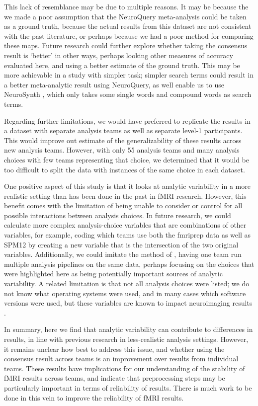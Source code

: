 \documentclass[a4paper,doc,natbib]{apa6}
\begin{document}
This lack of resemblance may be due to multiple reasons. It may be because the we made a poor assumption that the NeuroQuery meta-analysis could be taken as a ground truth, because the actual results from this dataset are not consistent with the past literature, or perhaps because we had a poor method for comparing these maps. Future research could further explore whether taking the consensus result is `better' in other ways, perhaps looking other measures of accuracy evaluated here, and using a better estimate of the ground truth. This may be more achievable in a study with simpler task; simpler search terms could result in a better meta-analytic result using NeuroQuery, as well enable us to use NeuroSynth \citealp{yarkoni2011large}, which only takes some single words and compound words as search terms.

Regarding further limitations, we would have preferred to replicate the results in a dataset with separate analysis teams as well as separate level-1 participants. This would improve out estimate of the generalizability of these results across new analysis teams. However, with only 55 analysis teams and many analysis choices with few teams representing that choice, we determined that it would be too difficult to split the data with instances of the same choice in each dataset.

One positive aspect of this study is that it looks at analytic variability in a more realistic setting than has been done in the past in fMRI research. However, this benefit comes with the limitation of being unable to consider or control for all possible interactions between analysis choices.  In future research, we could calculate more complex analysis-choice variables that are combinations of other variables, for example, coding which teams use both the fmriprep data as well as SPM12 by creating a new variable that is the intersection of the two original variables. Additionally, we could imitate the method of \cite{carp_secret_2012}, having one team run multiple analysis pipelines on the same data, perhaps focusing on the choices that were highlighted here as being potentially important sources of analytic variability. A related limitation is that not all analysis choices were listed; we do not know what operating systems were used, and in many cases which software versions were used, but these variables are known to impact neuroimaging results \citep{glatard_reproducibility_2015, gronenschild2012effects}.

In summary, here we find that analytic variability can contribute to differences in results, in line with previous research in less-realistic analysis settings. However, it remains unclear how best to address this issue, and whether using the consensus result across teams is an improvement over results from individual teams. These results have implications for our understanding of the stability of fMRI results across teams, and indicate that preprocessing steps may be particularly important in terms of reliability of results. There is much work to be done in this vein to improve the reliability of fMRI results. 
\end{document}
